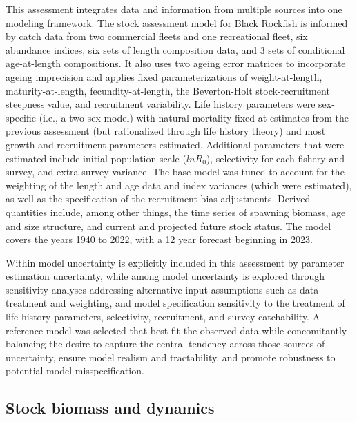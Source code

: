 \documentclass[11pt,
  english,
  letterpaper,
]{article}
\begin{document}
This assessment integrates data and information from multiple sources into one modeling framework. The stock assessment model for Black Rockfish is informed by catch data from two commercial fleets and one recreational fleet, six abundance indices, six sets of length composition data, and 3 sets of conditional age-at-length compositions. It also uses two ageing error matrices to incorporate ageing imprecision and applies fixed parameterizations of weight-at-length, maturity-at-length, fecundity-at-length, the Beverton-Holt stock-recruitment steepness value, and recruitment variability. Life history parameters were sex-specific (i.e., a two-sex model) with natural mortality fixed at estimates from the previous assessment (but rationalized through life history theory) and most growth and recruitment parameters estimated. Additional parameters that were estimated include initial population scale (\(lnR_0\)), selectivity for each fishery and survey, and extra survey variance. The base model was tuned to account for the weighting of the length and age data and index variances (which were estimated), as well as the specification of the recruitment bias adjustments. Derived quantities include, among other things, the time series of spawning biomass, age and size structure, and current and projected future stock status. The model covers the years 1940 to 2022, with a 12 year forecast beginning in 2023.

Within model uncertainty is explicitly included in this assessment by parameter estimation uncertainty, while among model uncertainty is explored through sensitivity analyses addressing alternative input assumptions such as data treatment and weighting, and model specification sensitivity to the treatment of life history parameters, selectivity, recruitment, and survey catchability. A reference model was selected that best fit the observed data while concomitantly balancing the desire to capture the central tendency across those sources of uncertainty, ensure model realism and tractability, and promote robustness to potential model misspecification.

\hypertarget{stock-biomass-and-dynamics}{%
\subsection*{Stock biomass and dynamics}\label{stock-biomass-and-dynamics}}
\end{document}
